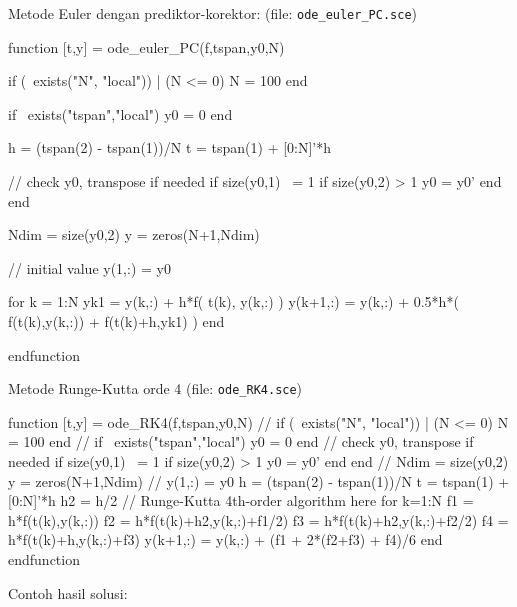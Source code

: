 \documentclass[10pt,bahasa]{article}
\begin{document}
Metode Euler dengan prediktor-korektor: (file: \texttt{ode\_euler\_PC.sce})

\begin{scilabcode}
function [t,y] = ode_euler_PC(f,tspan,y0,N)
  
  if (~exists("N", "local")) | (N <= 0)
    N = 100
  end
  
  if ~exists("tspan","local")
    y0 = 0
  end
  
  h = (tspan(2) - tspan(1))/N
  t = tspan(1) + [0:N]'*h
  
  // check y0, transpose if needed
  if size(y0,1) ~= 1
    if size(y0,2) > 1
      y0 = y0'
    end
  end

  Ndim = size(y0,2)
  y = zeros(N+1,Ndim)
  
  // initial value
  y(1,:) = y0

  for k = 1:N
    yk1 = y(k,:) + h*f( t(k), y(k,:) )
    y(k+1,:) = y(k,:) + 0.5*h*( f(t(k),y(k,:)) + f(t(k)+h,yk1) )
  end

endfunction
\end{scilabcode}

Metode Runge-Kutta orde 4 (file: \texttt{ode\_RK4.sce})

\begin{scilabcode}
function [t,y] = ode_RK4(f,tspan,y0,N)
  //
  if (~exists("N", "local")) | (N <= 0)
    N = 100
  end
  //
  if ~exists("tspan","local")
    y0 = 0
  end
  // check y0, transpose if needed
  if size(y0,1) ~= 1
    if size(y0,2) > 1
      y0 = y0'
    end
  end
  //
  Ndim = size(y0,2)
  y = zeros(N+1,Ndim)
  //
  y(1,:) = y0
  h = (tspan(2) - tspan(1))/N
  t = tspan(1) + [0:N]'*h
  h2 = h/2
  // Runge-Kutta 4th-order algorithm here
  for k=1:N
    f1 = h*f(t(k),y(k,:))
    f2 = h*f(t(k)+h2,y(k,:)+f1/2)
    f3 = h*f(t(k)+h2,y(k,:)+f2/2)
    f4 = h*f(t(k)+h,y(k,:)+f3)
    y(k+1,:) = y(k,:) + (f1 + 2*(f2+f3) + f4)/6
  end
endfunction
\end{scilabcode}

Contoh hasil solusi:
\end{document}
